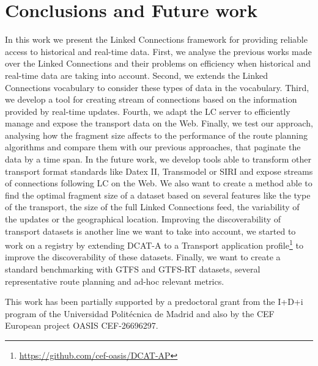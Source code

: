 \documentclass[sw]{iosart2x}
\begin{document}
\section{Conclusions and Future work}
In this work we present the Linked Connections framework for providing reliable access to historical and real-time data. First, we analyse the previous works made over the Linked Connections and their problems on efficiency when historical and real-time data are taking into account. Second, we extends the Linked Connections vocabulary to consider these types of data in the vocabulary. Third, we develop a tool for creating stream of connections based on the information provided by real-time updates. Fourth, we adapt the LC server to efficiently manage and expose the transport data on the Web. Finally, we test our approach, analysing how the fragment size affects to the performance of the route planning algorithms and compare them with our previous approaches, that paginate the data by a time span.
In the future work, we develop tools able to transform other transport format standards like Datex II, Transmodel or SIRI and expose streams of connections following LC on the Web. We also want to create a method able to find the optimal fragment size of a dataset based on several features like the type of the transport, the size of the full Linked Connections feed, the variability of the updates or the geographical location. Improving the discoverability of transport datasets is another line we want to take into account, we started to work on a registry by extending DCAT-A to a Transport application profile\footnote{\url{https://github.com/cef-oasis/DCAT-AP}} to improve the discoverability of these datasets. Finally, we want to create a standard benchmarking with GTFS and GTFS-RT datasets, several representative route planning and ad-hoc relevant metrics. 

\begin{acks}
This work has been partially supported by a predoctoral grant from the I+D+i program of the Universidad Polit\'ecnica de Madrid and also by the CEF European project OASIS CEF-26696297.
\end{acks}


\end{document}
